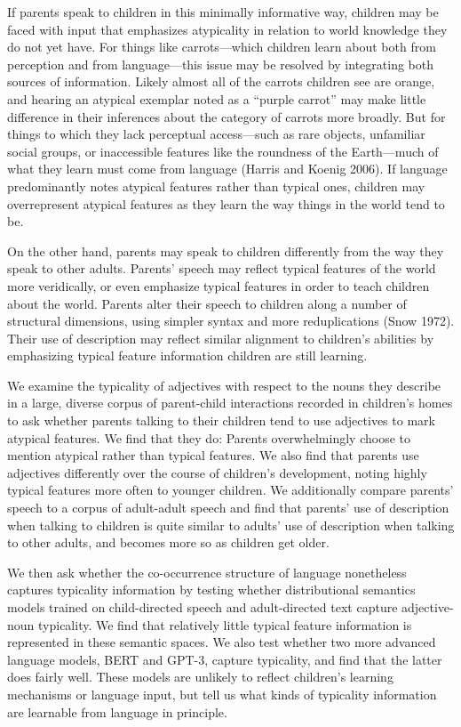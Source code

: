 \documentclass{ucetd}
\begin{document}
If parents speak to children in this minimally informative way, children
may be faced with input that emphasizes atypicality in relation to world
knowledge they do not yet have. For things like carrots---which children
learn about both from perception and from language---this issue may be
resolved by integrating both sources of information. Likely almost all
of the carrots children see are orange, and hearing an atypical exemplar
noted as a ``purple carrot'' may make little difference in their
inferences about the category of carrots more broadly. But for things to
which they lack perceptual access---such as rare objects, unfamiliar
social groups, or inaccessible features like the roundness of the
Earth---much of what they learn must come from language (Harris and
Koenig 2006). If language predominantly notes atypical features rather
than typical ones, children may overrepresent atypical features as they
learn the way things in the world tend to be.

On the other hand, parents may speak to children differently from the
way they speak to other adults. Parents' speech may reflect typical
features of the world more veridically, or even emphasize typical
features in order to teach children about the world. Parents alter their
speech to children along a number of structural dimensions, using
simpler syntax and more reduplications (Snow 1972). Their use of
description may reflect similar alignment to children's abilities by
emphasizing typical feature information children are still learning.

We examine the typicality of adjectives with respect to the nouns they
describe in a large, diverse corpus of parent-child interactions
recorded in children's homes to ask whether parents talking to their
children tend to use adjectives to mark atypical features. We find that
they do: Parents overwhelmingly choose to mention atypical rather than
typical features. We also find that parents use adjectives differently
over the course of children's development, noting highly typical
features more often to younger children. We additionally compare
parents' speech to a corpus of adult-adult speech and find that parents'
use of description when talking to children is quite similar to adults'
use of description when talking to other adults, and becomes more so as
children get older.

We then ask whether the co-occurrence structure of language nonetheless
captures typicality information by testing whether distributional
semantics models trained on child-directed speech and adult-directed
text capture adjective-noun typicality. We find that relatively little
typical feature information is represented in these semantic spaces. We
also test whether two more advanced language models, BERT and GPT-3,
capture typicality, and find that the latter does fairly well. These
models are unlikely to reflect children's learning mechanisms or
language input, but tell us what kinds of typicality information are
learnable from language in principle.
\end{document}
